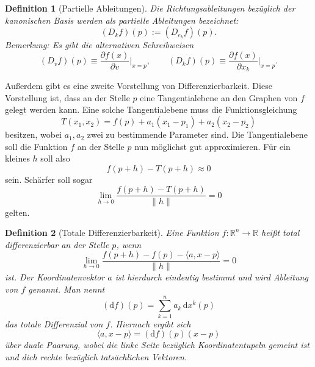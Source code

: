 \documentclass[a4paper,11pt,fleqn,twoside]{scrartcl}
\numberwithin{equation}{section}
\newcommand{\R}{\mathbb R}
\theoremstyle{rmbox}
\newtheorem{Definition}{Definition}
\begin{document}
\begin{Definition}[Partielle Ableitungen]
Die Richtungsableitungen bezüglich
der kanonischen Basis werden als \emph{partielle Ableitungen}
bezeichnet:
\begin{equation}
(D_k f)(p) := (D_{e_k} f)(p).
\end{equation}
Bemerkung: Es gibt die alternativen Schreibweisen
\begin{equation}
(D_v f)(p) \equiv \frac{\partial f(x)}{\partial v}\Big|_{x=p},\qquad
(D_k f)(p) \equiv \frac{\partial f(x)}{\partial x_k}\Big|_{x=p}.
\end{equation}
\end{Definition}
\noindent
Außerdem gibt es eine zweite Vorstellung von Differenzierbarkeit.
Diese Vorstellung ist, dass an der Stelle $p$ eine Tangentialebene
an den Graphen von $f$ gelegt werden kann. Eine solche
Tangentialebene muss die Funktionsgleichung
\begin{equation}
T(x_1,x_2) = f(p)+a_1(x_1-p_1)+a_2(x_2-p_2)
\end{equation}
besitzen, wobei $a_1,a_2$ zwei zu bestimmende Parameter sind.
Die Tangentialebene soll die Funktion $f$ an der Stelle $p$ nun
möglichst gut approximieren. Für ein kleines $h$ soll also
\begin{equation}
f(p+h)-T(p+h)\approx 0
\end{equation}
sein. Schärfer soll sogar
\begin{equation}
\lim_{h\to 0}\frac{f(p+h)-T(p+h)}{\|h\|}=0
\end{equation}
gelten.

\begin{Definition}[Totale Differenzierbarkeit]
Eine Funktion $f\colon\R^n\to\R$ heißt
\emph{total differenzierbar} an der Stelle $p$, wenn
\begin{equation}
\lim_{h\to 0}\frac{f(p+h)-f(p)-\langle a,x-p\rangle}{\|h\|}=0
\end{equation}
ist. Der Koordinatenvektor $a$ ist hierdurch eindeutig bestimmt und
wird Ableitung von $f$ genannt. Man nennt%
\begin{equation}
(\mathrm df)(p) = \sum_{k=1}^n a_k\,\mathrm dx^k(p)
\end{equation}
das \emph{totale Differenzial} von $f$. Hiernach ergibt sich
\begin{equation}
\langle a,x-p\rangle = (\mathrm df)(p)(x-p)
\end{equation}
über duale Paarung, wobei die linke Seite bezüglich Koordinatentupeln
gemeint ist und dich rechte bezüglich tatsächlichen Vektoren.
\end{Definition}
\end{document}
